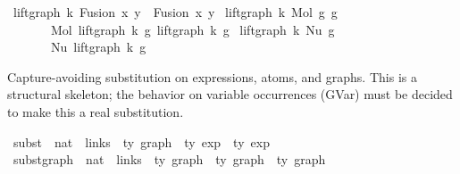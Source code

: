 \begin{isabellebody}
{\isacharbar}{\kern0pt}\ {\isachardoublequoteopen}lift{\isacharunderscore}{\kern0pt}graph\ k\ {\isacharparenleft}{\kern0pt}Fusion\ x\ y{\isacharparenright}{\kern0pt}\ {\isacharequal}{\kern0pt}\ Fusion\ x\ y{\isachardoublequoteclose}\isanewline
{\isacharbar}{\kern0pt}\ {\isachardoublequoteopen}lift{\isacharunderscore}{\kern0pt}graph\ k\ {\isacharparenleft}{\kern0pt}Mol\ g{}\ g{}{\isacharparenright}{\kern0pt}\ {\isacharequal}{\kern0pt}\isanewline
\ \ \ \ \ \ \ Mol\ {\isacharparenleft}{\kern0pt}lift{\isacharunderscore}{\kern0pt}graph\ k\ g{}{\isacharparenright}{\kern0pt}\ {\isacharparenleft}{\kern0pt}lift{\isacharunderscore}{\kern0pt}graph\ k\ g{}{\isacharparenright}{\kern0pt}{\isachardoublequoteclose}\isanewline
{\isacharbar}{\kern0pt}\ {\isachardoublequoteopen}lift{\isacharunderscore}{\kern0pt}graph\ k\ {\isacharparenleft}{\kern0pt}Nu\ g{\isacharparenright}{\kern0pt}\ {\isacharequal}{\kern0pt}\isanewline
\ \ \ \ \ \ \ Nu\ {\isacharparenleft}{\kern0pt}lift{\isacharunderscore}{\kern0pt}graph\ k\ g{\isacharparenright}{\kern0pt}{\isachardoublequoteclose}%
\begin{isamarkuptext}%
Capture-avoiding substitution  on expressions, atoms, and graphs.
  This is a structural skeleton; the behavior on variable occurrences (GVar)
  must be decided to make this a real substitution.%
\end{isamarkuptext}\isamarkuptrue%
\isamarkupfalse%
\ subst\ {\isacharcolon}{\kern0pt}{\isacharcolon}{\kern0pt}\ {\isachardoublequoteopen}nat\ {\isacharequal}{\kern0pt}{\isachargreater}{\kern0pt}\ links\ {\isacharequal}{\kern0pt}{\isachargreater}{\kern0pt}\ {\isacharprime}{\kern0pt}ty\ graph\ {\isacharequal}{\kern0pt}{\isachargreater}{\kern0pt}\ {\isacharprime}{\kern0pt}ty\ exp\ {\isacharequal}{\kern0pt}{\isachargreater}{\kern0pt}\ {\isacharprime}{\kern0pt}ty\ exp{\isachardoublequoteclose}\isanewline
{}\ subst{\isacharunderscore}{\kern0pt}graph\ {\isacharcolon}{\kern0pt}{\isacharcolon}{\kern0pt}\ {\isachardoublequoteopen}nat\ {\isacharequal}{\kern0pt}{\isachargreater}{\kern0pt}\ links\ {\isacharequal}{\kern0pt}{\isachargreater}{\kern0pt}\ {\isacharprime}{\kern0pt}ty\ graph\ {\isacharequal}{\kern0pt}{\isachargreater}{\kern0pt}\ {\isacharprime}{\kern0pt}ty\ graph\ {\isacharequal}{\kern0pt}{\isachargreater}{\kern0pt}\ {\isacharprime}{\kern0pt}ty\ graph{\isachardoublequoteclose}\isanewline

\end{isabellebody}
